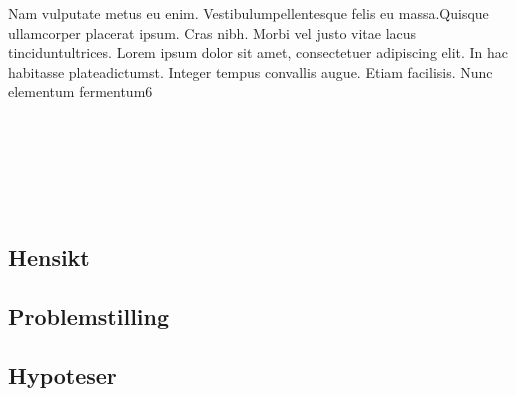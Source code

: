 Nam vulputate metus eu enim. Vestibulumpellentesque felis eu massa.Quisque  ullamcorper  placerat  ipsum.  Cras  nibh.  Morbi  vel  justo  vitae  lacus  tinciduntultrices. Lorem ipsum dolor sit amet, consectetuer adipiscing elit. In hac habitasse plateadictumst.  Integer  tempus  convallis  augue.  Etiam  facilisis.  Nunc  elementum  fermentum6


\parencite{datatilsynet_personvern}\\
\parencite{regjeringen_personvern}\\
\parencite{regjeringen_gdpr}\\
\parencite{regjeringen_nylov}\\
\parencite{test}\\

\subsection{Hensikt}

\subsection{Problemstilling}

\subsection{Hypoteser}

\newpage
